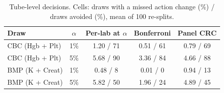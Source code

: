 \begin{table}[t]\centering\footnotesize
\caption{Tube-level decisions. Cells: draws with a missed action change (\%) / draws avoided (\%), mean of 100 re-splits.}
\label{tab:panel}\setlength{\tabcolsep}{2.5pt}
\begin{tabular}{lcccc}\toprule
Draw & $\alpha$ & Per-lab at $\alpha$ & Bonferroni & Panel CRC \\ \midrule
CBC (Hgb + Plt) & 1\% & 1.20 / 71 & 0.51 / 61 & 0.79 / 69 \\
CBC (Hgb + Plt) & 5\% & 5.68 / 90 & 3.36 / 84 & 4.66 / 88 \\
BMP (K + Creat) & 1\% & 0.48 / 8 & 0.01 / 0 & 0.94 / 13 \\
BMP (K + Creat) & 5\% & 5.82 / 50 & 1.96 / 24 & 4.89 / 45 \\
\bottomrule\end{tabular}\end{table}
